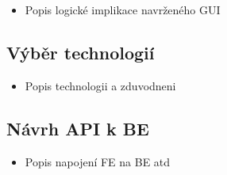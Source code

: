 \documentclass[a4paper,12pt]{article}
\begin{document}
\begin{itemize}
    \item Popis  logické implikace navrženého GUI
\end{itemize}


\subsection*{Výběr technologií}
\begin{itemize}
    \item Popis technologii a zduvodneni
\end{itemize}

\subsection*{Návrh API k BE}
\begin{itemize}
    \item Popis  napojení FE na BE atd
\end{itemize}
\end{document}
